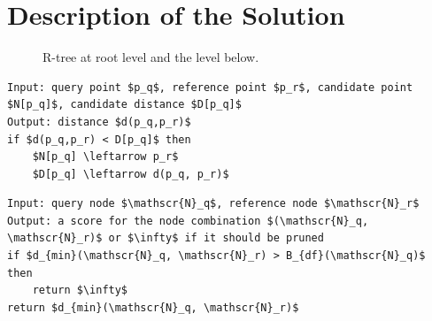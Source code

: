 \documentclass{utue} %
\begin{document}
\section{Description of the Solution}
\begin{figure}
	\begin{subfigure}{.24\textwidth}
	\end{subfigure}
	\begin{subfigure}{.24\textwidth}
	\end{subfigure}
	\caption{R-tree at root level and the level below.}
\end{figure}
\begin{lstlisting}[caption={Simple \texttt{BaseCase()} for nearest neighbor search.}]
Input: query point $p_q$, reference point $p_r$, candidate point $N[p_q]$, candidate distance $D[p_q]$
Output: distance $d(p_q,p_r)$
if $d(p_q,p_r) < D[p_q]$ then
	$N[p_q] \leftarrow p_r$
	$D[p_q] \leftarrow d(p_q, p_r)$
\end{lstlisting}
\begin{lstlisting}[caption={Simple \texttt{Score()} for nearest neighbor search}]
Input: query node $\mathscr{N}_q$, reference node $\mathscr{N}_r$
Output: a score for the node combination $(\mathscr{N}_q, \mathscr{N}_r)$ or $\infty$ if it should be pruned
if $d_{min}(\mathscr{N}_q, \mathscr{N}_r) > B_{df}(\mathscr{N}_q)$ then
	return $\infty$
return $d_{min}(\mathscr{N}_q, \mathscr{N}_r)$
\end{lstlisting}
\end{document}
